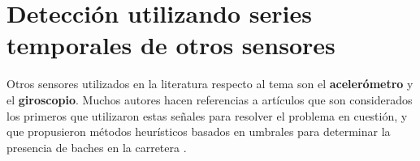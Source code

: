 










\section{Detección utilizando series temporales de otros sensores}
	Otros sensores utilizados en la literatura respecto al tema son el \textbf{acelerómetro} y el \textbf{giroscopio}. Muchos
	autores hacen referencias a artículos que son considerados los primeros que utilizaron estas señales para resolver el 
	problema en cuestión, y que propusieron métodos heurísticos basados en umbrales para determinar la presencia de
	baches en la carretera .

